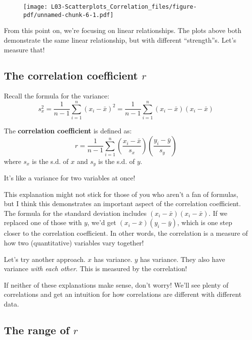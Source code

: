 \documentclass[
  letterpaper,
  DIV=11,
  numbers=noendperiod]{scrreprt}
\begin{document}
\begin{figure}[H]

{\centering \texttt{[image: L03-Scatterplots\_Correlation\_files/figure-pdf/unnamed-chunk-6-1.pdf]}

}

\end{figure}

From this point on, we're focusing on linear relationships. The plots
above both demonstrate the same linear relationship, but with different
``strength''s. Let's measure that!

\hypertarget{the-correlation-coefficient-r}{%
\subsection{\texorpdfstring{The correlation coefficient
\(r\)}{The correlation coefficient r}}\label{the-correlation-coefficient-r}}

Recall the formula for the variance: \[
s_x^2 = \frac{1}{n-1}\sum_{i=1}^n(x_i - \bar x)^2 = \frac{1}{n-1}\sum_{i=1}^n(x_i - \bar x)(x_i - \bar x) 
\]

The \textbf{correlation coefficient} is defined as: \[
r = \frac{1}{n-1}\sum_{i=1}^n\left(\frac{x_i - \bar x}{s_x}\right)\left(\frac{y_i - \bar y}{s_y}\right)
\] where \(s_x\) is the s.d. of \(x\) and \(s_y\) is the s.d. of \(y\).

It's like a variance for two variables at once!

This explanation might not stick for those of you who aren't a fan of
formulas, but I think this demonstrates an important aspect of the
correlation coefficient. The formula for the standard deviation includes
\((x_i - \bar x)(x_i - \bar x)\). If we replaced one of those with
\(y\), we'd get \((x_i - \bar x)(y_i - \bar y)\), which is one step
closer to the correlation coefficient. In other words, the correlation
is a measure of how two (quantitative) variables vary together!

Let's try another approach. \(x\) has variance. \(y\) has variance. They
also have variance \emph{with each other}. This is measured by the
correlation!

If neither of these explanations make sense, don't worry! We'll see
plenty of correlations and get an intuition for how correlations are
different with different data.

\hypertarget{the-range-of-r}{%
\subsection{\texorpdfstring{The range of
\(r\)}{The range of r}}\label{the-range-of-r}}
\end{document}
